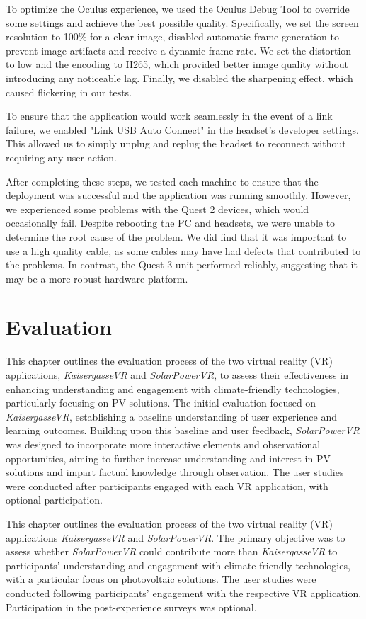 \documentclass[draft, final]{vutinfth} %
\begin{document}
To optimize the Oculus experience, we used the Oculus Debug Tool to override some settings and achieve the best possible quality. Specifically, we set the screen resolution to 100\% for a clear image, disabled automatic frame generation to prevent image artifacts and receive a dynamic frame rate. We set the distortion to low and the encoding to H265, which provided better image quality without introducing any noticeable lag. Finally, we disabled the sharpening effect, which caused flickering in our tests.

To ensure that the application would work seamlessly in the event of a link failure, we enabled "Link USB Auto Connect" in the headset's developer settings. This allowed us to simply unplug and replug the headset to reconnect without requiring any user action.

After completing these steps, we tested each machine to ensure that the deployment was successful and the application was running smoothly. However, we experienced some problems with the Quest 2 devices, which would occasionally fail. Despite rebooting the PC and headsets, we were unable to determine the root cause of the problem. We did find that it was important to use a high quality cable, as some cables may have had defects that contributed to the problems. In contrast, the Quest 3 unit performed reliably, suggesting that it may be a more robust hardware platform.

\chapter{Evaluation}

This chapter outlines the evaluation process of the two virtual reality (VR) applications, \textit{KaisergasseVR} and \textit{SolarPowerVR}, to assess their effectiveness in enhancing understanding and engagement with climate-friendly technologies, particularly focusing on PV solutions. The initial evaluation focused on \textit{KaisergasseVR}, establishing a baseline understanding of user experience and learning outcomes. Building upon this baseline and user feedback, \textit{SolarPowerVR} was designed to incorporate more interactive elements and observational opportunities, aiming to further increase understanding and interest in PV solutions and impart factual knowledge through observation. The user studies were conducted after participants engaged with each VR application, with optional participation. 

This chapter outlines the evaluation process of the two virtual reality (VR) applications \textit{KaisergasseVR} and \textit{SolarPowerVR}. The primary objective was to assess whether \textit{SolarPowerVR} could contribute more than \textit{KaisergasseVR} to participants' understanding and engagement with climate-friendly technologies, with a particular focus on photovoltaic solutions. The user studies were conducted following participants' engagement with the respective VR application. Participation in the post-experience surveys was optional.
\end{document}
